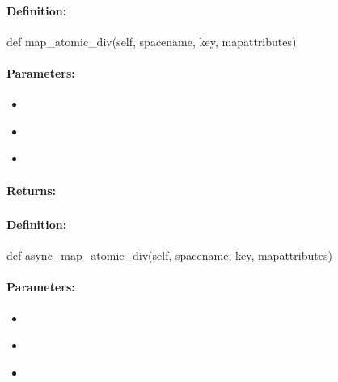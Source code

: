 \paragraph{Definition:}
\begin{pythoncode}
def map_atomic_div(self, spacename, key, mapattributes)
\end{pythoncode}

\paragraph{Parameters:}
\begin{itemize}[noitemsep]
\item {}\\

\item {}\\

\item {}\\

\end{itemize}

\paragraph{Returns:}


\pagebreak
\subsubsection{}
\label{api:python:async_map_atomic_div}


\paragraph{Definition:}
\begin{pythoncode}
def async_map_atomic_div(self, spacename, key, mapattributes)
\end{pythoncode}

\paragraph{Parameters:}
\begin{itemize}[noitemsep]
\item {}\\

\item {}\\

\item {}\\

\end{itemize}

